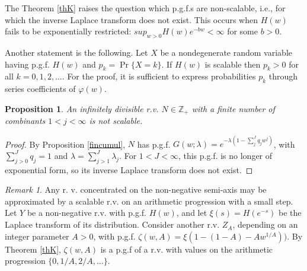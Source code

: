 \documentclass[a4paper,12pt]{amsart}
\newcommand{\Z}{\mathbb{Z}_{+}}
\newtheorem{Proposition}{Proposition}[section]
\theoremstyle{definition}
\theoremstyle{remark}
\newtheorem{Remark}{Remark}[section]
\begin{document}
The Theorem \ref{thK} raises the question which p.g.f.{}s are non-scalable, i.e., for which the inverse Laplace transform does not exist. This occurs when $H(w)$ fails to be exponentially restricted: $sup_{w>0}H(w)e^{-bw}<\infty$ for some $b>0$. 

Another statement is the following. Let $X$ be a nondegenerate random variable having p.g.f. $H(w)$ and $p_k=\Pr\{X=k\}$. If $H(w)$ is scalable then $p_k>0$ for all $k=0,1,2,\ldots$. For the proof, it is sufficient to express probabilities $p_k$ through series coefficients of $\varphi(w)$.

\begin{Proposition}\label{nonscal}
An infinitely divisible r.v. $N\in \Z$ with a finite number of combinants $1<j<\infty$ is not scalable. 
\end{Proposition}
\begin{proof}
By Proposition \ref{fincumul},  $N$ has p.g.f. $G(w;\lambda)=e^{-\lambda(1-\sum_j^J q_j w^j)}$, with $\sum_{j>0}^J q_j=1$ and $\lambda=\sum_{j>1}^J\lambda_j$. For $1<J<\infty$, this p.g.f. is no longer of exponential form, so its inverse Laplace transform does not exist.
\end{proof}

\begin{Remark}\label{reKl}
Any r. v. concentrated on the non-negative semi-axis may be approximated by a scalable r.v. on an arithmetic progression with a small step. Let $Y$ be a non-negative r.v. with p.g.f. $H(w)$, and let $\xi(s)=H(e^{-s})$ be the Laplace transform of its distribution. Consider another r.v. $Z_A$, depending on an integer parameter $A>0$, with p.g.f. $\zeta(w,A) = \xi(1-(1-A)-A w^{1/A}))$. By Theorem \ref{thK}, $\zeta(w, A)$ is a p.g.f of a r.v. with values on the arithmetic progression $\{0,1/A,2/A, \ldots \}$. 
\end{Remark}
\end{document}
